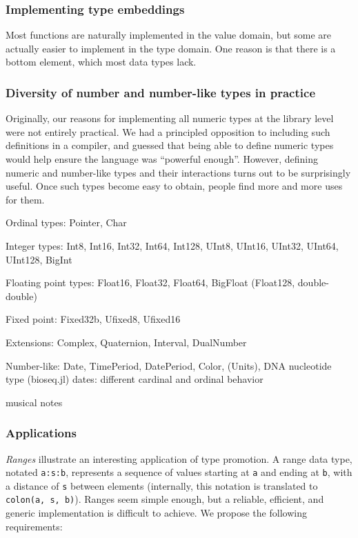
\subsubsection{Implementing type embeddings}

Most functions are naturally implemented in the value domain, but some are
actually easier to implement in the type domain. One reason is that there
is a bottom element, which most data types lack.

\subsubsection{Diversity of number and number-like types in practice}

Originally, our reasons for implementing all numeric types at the library
level were not entirely practical. We had a principled opposition to
including such definitions in a compiler, and guessed that being able to
define numeric types would help ensure the language was ``powerful enough''.
However, defining numeric and number-like types and their interactions turns
out to be surprisingly useful. Once such types become easy to obtain,
people find more and more uses for them.

Ordinal types: Pointer, Char

Integer types: Int8, Int16, Int32, Int64, Int128, UInt8, UInt16, UInt32, UInt64, UInt128, BigInt

Floating point types: Float16, Float32, Float64, BigFloat
(Float128, double-double)

Fixed point: Fixed32{b}, Ufixed8, Ufixed16

Extensions: Complex, Quaternion, Interval, DualNumber

Number-like: Date, TimePeriod, DatePeriod, Color, (Units), DNA nucleotide type (bioseq.jl)
dates: different cardinal and ordinal behavior

musical notes

\subsubsection{Applications}

\emph{Ranges} illustrate an interesting application of type promotion.
A range data type, notated \texttt{a:s:b}, represents a sequence of values
starting at \texttt{a} and ending at \texttt{b}, with a distance of \texttt{s}
between elements (internally, this notation is translated to
\texttt{colon(a, s, b)}). Ranges seem simple enough, but a reliable,
efficient, and generic implementation is difficult to achieve.
We propose the following requirements:

